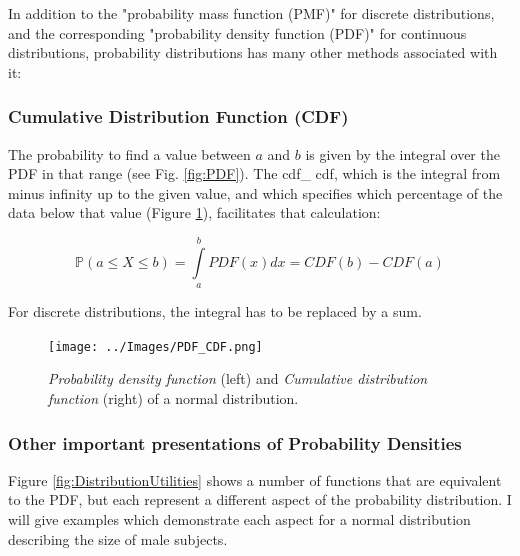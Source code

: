 In addition to the "probability mass function (PMF)" for discrete distributions, and the corresponding "probability density function (PDF)" for continuous distributions, probability distributions has many other methods associated with it:

\subsubsection{Cumulative Distribution Function (CDF)}

The probability to find a value between $a$ and $b$ is given by the integral over the PDF in that range (see Fig. \ref{fig:PDF}). The \gls{cdf_} \acrshort{cdf}, which is the integral from minus infinity up to the given value, and which specifies which percentage of the data below that value (Figure \ref{fig:CDF}), facilitates that calculation:

\begin{equation}
   \mathbb{P}(a \leq X \leq b) = \int\limits_a^b {PDF(x)dx} = CDF(b) - CDF(a)
\end{equation}

For discrete distributions, the integral has to be replaced by a sum.

\begin{figure}[ht]
  \centering
  \texttt{[image: ../Images/PDF\_CDF.png]}\\
  \caption{\emph{Probability density function} (left) and \emph{Cumulative distribution function} (right) of a normal distribution.}\label{fig:CDF}
\end{figure}

\subsubsection{Other important presentations of Probability Densities}

Figure \ref{fig:DistributionUtilities} shows a number of functions that are equivalent to the PDF, but each represent a different aspect of the probability distribution. I will give examples which demonstrate each aspect for a normal distribution describing the size of male subjects.

